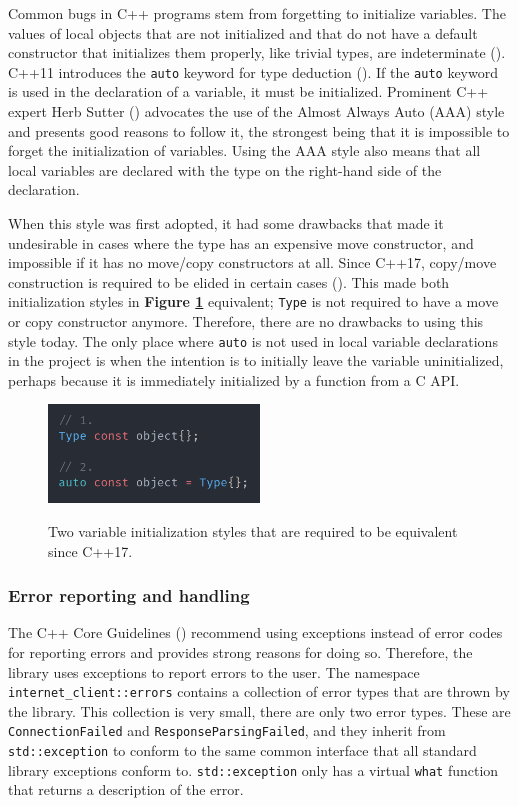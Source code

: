 \documentclass[12pt, a4paper]{article}
\begin{document}
Common bugs in C++ programs stem from forgetting to initialize variables. The values of local objects that are not initialized and that do not have a default constructor that initializes them properly, like trivial types, are indeterminate (\cite{CppDefaultInitialization}). C++11 introduces the \texttt{auto} keyword for type deduction (\cite{CppAuto}). If the \texttt{auto} keyword is used in the declaration of a variable, it must be initialized. Prominent C++ expert Herb Sutter (\citeyear{AlmostAlwaysAuto}) advocates the use of the Almost Always Auto (AAA) style and presents good reasons to follow it, the strongest being that it is impossible to forget the initialization of variables. Using the AAA style also means that all local variables are declared with the type on the right-hand side of the declaration. 

When this style was first adopted, it had some drawbacks that made it undesirable in cases where the type has an expensive move constructor, and impossible if it has no move/copy constructors at all. Since C++17, copy/move construction is required to be elided in certain cases (\cite{CppCopyElision}). This made both initialization styles in \textbf{Figure \ref{fig:auto_type_deduction}} equivalent; \texttt{Type} is not required to have a move or copy constructor anymore. Therefore, there are no drawbacks to using this style today. The only place where \texttt{auto} is not used in local variable declarations in the project is when the intention is to initially leave the variable uninitialized, perhaps because it is immediately initialized by a function from a C API.

\begin{figure}[ht]
	\centering
	\caption{Two variable initialization styles that are required to be equivalent since C++17.}
	\includegraphics[width=0.5\textwidth]{auto_type_deduction}
	\label{fig:auto_type_deduction}
\end{figure}

\subsubsection{Error reporting and handling}
The C++ Core Guidelines (\cite{CppCoreGuidelines}) recommend using exceptions instead of error codes for reporting errors and provides strong reasons for doing so. Therefore, the library uses exceptions to report errors to the user. The namespace \texttt{internet\_client::errors} contains a collection of error types that are thrown by the library. This collection is very small, there are only two error types. These are \texttt{ConnectionFailed} and \texttt{ResponseParsingFailed}, and they inherit from \texttt{std::exception} to conform to the same common interface that all standard library exceptions conform to. \texttt{std::exception} only has a virtual \texttt{what} function that returns a description of the error. 
\end{document}
